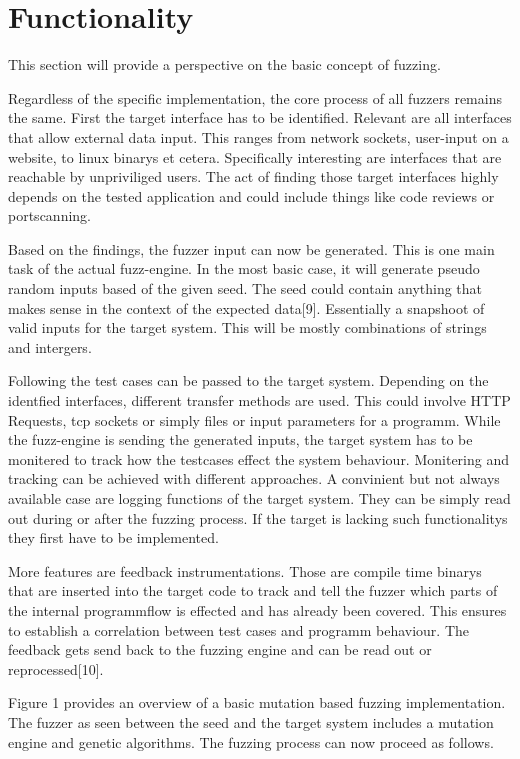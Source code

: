 \documentclass[journal=tosc,final]{iacrtrans}
\begin{document}
\section{Functionality}
This section will provide a perspective on the basic concept of fuzzing.

Regardless of the specific implementation, the core process of all fuzzers remains the same. First the target interface has to be identified. Relevant are all interfaces that allow external data input. This ranges from network sockets, user-input on a website, to linux binarys et cetera. Specifically interesting are interfaces that are reachable by unpriviliged users. The act of finding those target interfaces highly depends on the tested application and could include things like code reviews or portscanning. 


Based on the findings, the fuzzer input can now be generated. This is one main task of the actual fuzz-engine. In the most basic case, it will generate pseudo random inputs based of the given seed. The seed could contain anything that makes sense in the context of the expected data[9]. Essentially a snapshoot of valid inputs for the target system. This will be mostly combinations of strings and intergers. 

Following the test cases can be passed to the  target system. Depending on the identfied interfaces, different transfer methods are used. This could involve HTTP Requests, tcp sockets or simply files or input parameters for a programm. While the fuzz-engine is sending the generated inputs, the target system has to be monitered to track how the testcases effect the system behaviour. Monitering and tracking can be achieved with different approaches. A convinient but not always available case are logging functions of the target system. They can be simply read out during or after the fuzzing process. If the target is lacking such functionalitys they first have to be implemented. 

More features are feedback instrumentations. Those are compile time binarys that are inserted into the target code to track and tell the fuzzer which parts of the internal programmflow is effected and has already been covered. This ensures to establish a correlation between test cases and programm behaviour. The feedback gets send back to the fuzzing engine and can be read out or reprocessed[10].
\newpage

\noindent Figure 1 provides an overview of a basic mutation based fuzzing implementation. The fuzzer as seen between the seed and the target system includes a mutation engine and genetic algorithms. The fuzzing process can now proceed as follows.
\end{document}
